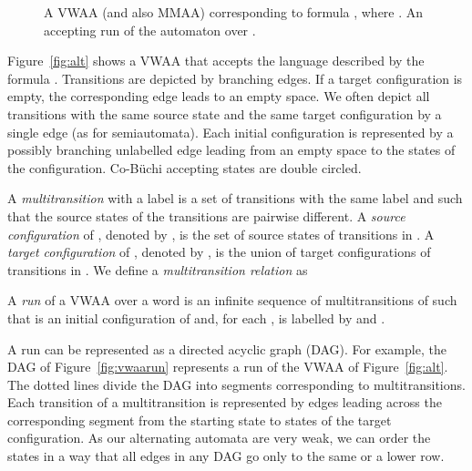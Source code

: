 \documentclass{llncs}
\begin{document}
\begin{figure}[!t]
{
  }
  \caption{ A VWAA (and also
    MMAA) corresponding to formula , where .  An accepting run of the automaton
over .}
\end{figure}



Figure~\ref{fig:alt} shows a VWAA that accepts the
language described by the formula .
Transitions are depicted by branching edges.  If a target configuration
is empty, the corresponding edge leads to an empty space.  We often depict all
transitions with the same source state and the same target configuration by
a single edge (as for semiautomata).  Each initial configuration is
represented by a possibly branching unlabelled edge leading from an empty
space to the states of the configuration.  Co-B\"{u}chi accepting states are
double circled.



A \emph{multitransition}  with a label  is a set of transitions
with the same label and such that the source states of the transitions are
pairwise different.  A \emph{source configuration} of , denoted by
, is the set of source states of transitions in .  A
\emph{target configuration} of , denoted by , is the union of
target configurations of transitions in .  We define a
\emph{multitransition relation}  as 



A \emph{run}  of a VWAA  over a word  is an infinite sequence  of multitransitions of
 such that  is an initial configuration of  and, for
each ,  is labelled by  and . 

A run can be represented as a directed acyclic graph (DAG).  For example,
the DAG of Figure~\ref{fig:vwaarun} represents a run of the VWAA of
Figure~\ref{fig:alt}.  The dotted lines divide the DAG into segments
corresponding to multitransitions.  Each transition of a multitransition is
represented by edges leading across the corresponding segment from the
starting state to states of the target configuration. As our alternating
automata are very weak, we can order the states in a way that all edges
in any DAG go only to the same or a lower row.
\end{document}
